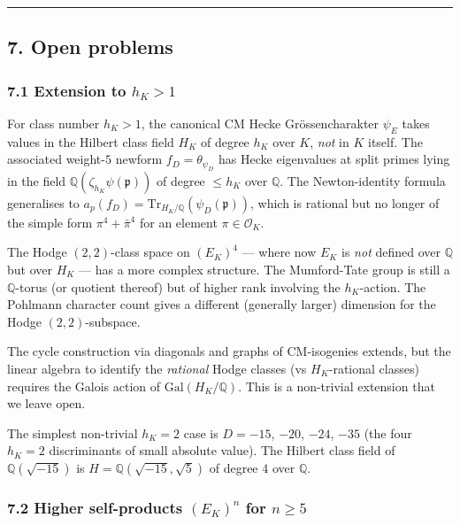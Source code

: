 \documentclass[
  11pt,
  a4paper,
]{amsart}
\begin{document}
\begin{center}\rule{0.5\linewidth}{0.5pt}\end{center}

\hypertarget{open-problems}{%
\subsection{7. Open problems}\label{open-problems}}

\hypertarget{extension-to-h_k-1}{%
\subsubsection{\texorpdfstring{7.1 Extension to \(h_K > 1\)}{7.1 Extension to h\_K \textgreater{} 1}}\label{extension-to-h_k-1}}

For class number \(h_K > 1\), the canonical CM Hecke Grössencharakter \(\psi_E\) takes values in the Hilbert class field \(H_K\) of degree \(h_K\) over \(K\), \emph{not} in \(K\) itself. The associated weight-\(5\) newform \(f_D = \theta_{\psi_D}\) has Hecke eigenvalues at split primes lying in the field \(\mathbb{Q}(\zeta_{h_K} \psi(\mathfrak{p}))\) of degree \(\leq h_K\) over \(\mathbb{Q}\). The Newton-identity formula generalises to \(a_p(f_D) = \mathrm{Tr}_{H_K/\mathbb{Q}}(\psi_D(\mathfrak{p}))\), which is rational but no longer of the simple form \(\pi^4 + \bar\pi^4\) for an element \(\pi \in \mathcal{O}_K\).

The Hodge \((2, 2)\)-class space on \((E_K)^4\) --- where now \(E_K\) is \emph{not} defined over \(\mathbb{Q}\) but over \(H_K\) --- has a more complex structure. The Mumford-Tate group is still a \(\mathbb{Q}\)-torus (or quotient thereof) but of higher rank involving the \(h_K\)-action. The Pohlmann character count gives a different (generally larger) dimension for the Hodge \((2,2)\)-subspace.

The cycle construction via diagonals and graphs of CM-isogenies extends, but the linear algebra to identify the \emph{rational} Hodge classes (vs \(H_K\)-rational classes) requires the Galois action of \(\mathrm{Gal}(H_K / \mathbb{Q})\). This is a non-trivial extension that we leave open.

The simplest non-trivial \(h_K = 2\) case is \(D = -15\), \(-20\), \(-24\), \(-35\) (the four \(h_K = 2\) discriminants of small absolute value). The Hilbert class field of \(\mathbb{Q}(\sqrt{-15})\) is \(H = \mathbb{Q}(\sqrt{-15}, \sqrt 5)\) of degree \(4\) over \(\mathbb{Q}\).

\hypertarget{higher-self-products-e_kn-for-n-geq-5}{%
\subsubsection{\texorpdfstring{7.2 Higher self-products \((E_K)^n\) for \(n \geq 5\)}{7.2 Higher self-products (E\_K)\^{}n for n \textbackslash geq 5}}\label{higher-self-products-e_kn-for-n-geq-5}}
\end{document}
